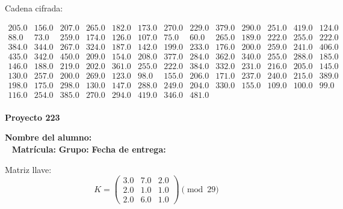 \documentclass[12pt]{article}
\begin{document}
Cadena cifrada:
\begin{center}
$\begin{array}{lllllllllllll}
205.0 & 156.0 & 207.0 & 265.0 & 182.0 & 173.0 & 270.0 & 229.0 & 379.0 & 290.0 & 251.0 & 419.0 & 124.0\\
88.0 & 73.0 & 259.0 & 174.0 & 126.0 & 107.0 & 75.0 & 60.0 & 265.0 & 189.0 & 222.0 & 255.0 & 222.0\\
384.0 & 344.0 & 267.0 & 324.0 & 187.0 & 142.0 & 199.0 & 233.0 & 176.0 & 200.0 & 259.0 & 241.0 & 406.0\\
435.0 & 342.0 & 450.0 & 209.0 & 154.0 & 208.0 & 377.0 & 284.0 & 362.0 & 340.0 & 255.0 & 288.0 & 185.0\\
146.0 & 188.0 & 219.0 & 202.0 & 361.0 & 255.0 & 222.0 & 384.0 & 332.0 & 231.0 & 216.0 & 205.0 & 145.0\\
130.0 & 257.0 & 200.0 & 269.0 & 123.0 & 98.0 & 155.0 & 206.0 & 171.0 & 237.0 & 240.0 & 215.0 & 389.0\\
198.0 & 175.0 & 298.0 & 130.0 & 147.0 & 288.0 & 249.0 & 204.0 & 330.0 & 155.0 & 109.0 & 100.0 & 99.0\\
116.0 & 254.0 & 385.0 & 270.0 & 294.0 & 419.0 & 346.0 & 481.0\\
\end{array}$
\end{center}

\newpage


\textbf{Proyecto 223}

\textbf{Nombre del alumno:} \underline{\hspace{13cm}}\\\
\vspace{1cm}
\textbf{Matrícula:} \underline{\hspace{4cm}} \hspace{1cm}
\textbf{Grupo:} \underline{\hspace{2cm}}
\textbf{Fecha de entrega:} \underline{\hspace{2cm}}

\medskip

Matriz llave:
\[
K = \begin{pmatrix}
3.0 & 7.0 & 2.0\\
2.0 & 1.0 & 1.0\\
2.0 & 6.0 & 1.0
\end{pmatrix} \pmod{29}
\]
\end{document}

